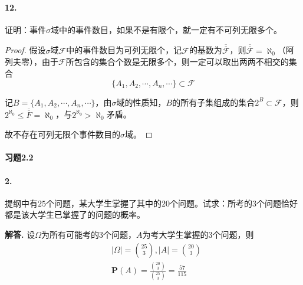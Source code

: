\documentclass[12pt, a4paper, oneside]{ctexart}
\newenvironment{solution}{\par\noindent\textbf{解答. }}{\bigskip\par}
\begin{document}
\paragraph{12.}证明：事件$\sigma$域中的事件数目，如果不是有限个，就一定有不可列无限多个。
\begin{proof}
    
假设$\sigma$域$\mathscr{F}$中的事件数目为可列无限个，记$\mathscr{F}$的基数为$\overline{\overline{\mathscr{F}}}$，则$\overline{\overline{\mathscr{F}}}=\aleph_0$（阿列夫零），由于$\mathscr{F}$所包含的集合个数是无限多个，则一定可以取出两两不相交的集合
\begin{equation*}
    \{A_1,A_2,\cdots, A_n,\cdots\}\subset \mathscr{F}
\end{equation*}

记$B = \{A_1,A_2,\cdots,A_n,\cdots\}$，由$\sigma$域的性质知，$B$的所有子集组成的集合$2^B\subset \mathscr{F}$，则$2^{\aleph_0}\leqslant \overline{\overline{F}} = \aleph_0$，与$2^{\aleph_0} > \aleph_0$矛盾。

故不存在可列无限个事件数目的$\sigma$域。
\end{proof}
\paragraph{习题2.2}
\paragraph{2.}提纲中有$25$个问题，某大学生掌握了其中的$20$个问题。试求：所考的$3$个问题恰好都是该大学生已掌握了的问题的概率。
\begin{solution}
    设$\Omega$为所有可能考的$3$个问题，$A$为考大学生掌握的$3$个问题，则
    \begin{equation*}
        \begin{aligned}
            &|\Omega| = \binom{25}{3}, |A| = \binom{20}{3}\\
            &\textbf{P}(A) = \frac{\binom{20}{3}}{\binom{25}{3}} = \frac{57}{115}
        \end{aligned}
    \end{equation*}
\end{solution}
\end{document}
